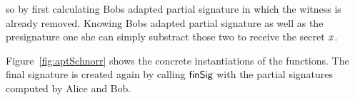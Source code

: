 \begin{definition}
\begin{itemize}
        so by first calculating Bobs adapted partial signature in which the witness is already removed. Knowing Bobs adapted partial signature as well as the presignature one she
        can simply substract those two to receive the secret $\mathit{x}$.
    \end{itemize}
    Figure~\ref{fig:aptSchnorr} shows the concrete instantiations of the functions. The final signature is created again by calling $\mathsf{finSig}$ with the partial signatures computed by Alice and Bob.
\end{definition}

\begin{figure}
    \fbox{
        \parbox{\textwidth} {
            \procedure[linenumbering, syntaxhighlight=auto]{$\procSetupApt{\varSecParam}$} {
                (\varNonce \opSeperate \varRand) \opFunResult \procSetupPartSig{\varSecParam} \\
                \varWit \sample \cnstIntegersPrimeWithoutZero{\varPrime} \\
                \varStatement \opAssign \funGen{\varWit} \\
                \pcreturn ((\varNonce \opSeperate \varRand)\opSeperate (\varWit, \varStatement))
            }
            \procedure[linenumbering, syntaxhighlight=auto]{$\procGenPtAptSig{\varMsg}{\varSecKeyAlice}{\varNonceAlice}{\varPubKeyBob}{\varRandBob}{\varWit}$}{
                \varSigBob \opFunResult \procGenPartSig{\varMsg}{\varSecKeyAlice}{\varNonceAlice}{\varPubKeyBob}{\varRandBob} \\
                \varS \opAssign \opAccess{\varSigBob}{\varS} \opAddScalar \varWit \\
                \pcreturn \varSigAptAlice \opAssign (\varS \opSeperate \varStatement)
            } \\[2\baselineskip]
            \procedure[linenumbering, syntaxhighlight=auto]{$\procVrfApt{\varMsg}{\varSecKeyAlice}{\varNonceAlice}{\varPubKeyBob}{\varRandBob}{\varStatement}{\varSigAptBob}$} {
                \varSchnorrChallenge \opAssign \funHash{\varMsg \opConc \varPubKeyAlice \opAddPoint \varPubKeyBob \opConc \varRandAlice \opAddPoint \varRandBob} \\
                \pcreturn \funGen{\varSigAptBob} \opEq \opPointScalar{\varRandBob}{\varSchnorrChallenge} \opAddPoint \varPubKeyBob \opAddPoint \funGen{\varWit}
            }
            \procedure[linenumbering, syntaxhighlight=auto]{$\procFinAptSig{\varSigAlice}{\varSigAptBob}{\varRandAlice}{\varRandBob}{\varWit}$}{
                \varSigBob \opAssign \varSigAptBob \opSub \varWit \\
}}}
\end{figure}
